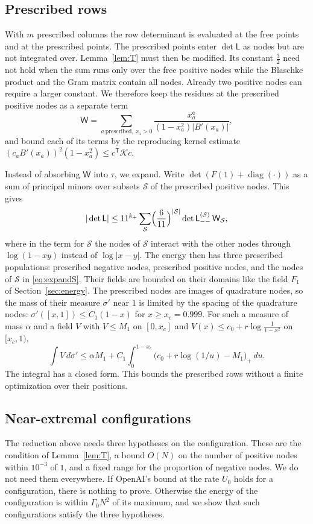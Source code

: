 \documentclass[11pt]{amsart}
\theoremstyle{definition}
\theoremstyle{remark}
\numberwithin{equation}{section}
\newcommand{\cK}{\mathcal K}
\begin{document}
\subsection{Prescribed rows}\label{ssec:fixedrows}
With $m$ prescribed columns the row determinant is evaluated at the free points and at the prescribed
points. The prescribed points enter $\det\mathsf L$ as nodes but are not integrated over. Lemma~\ref{lem:T}
must then be modified. Its constant $\frac32$ need not hold when the sum runs only over the free positive
nodes while the Blaschke product and the Gram matrix contain all nodes. Already two positive nodes can
require a larger constant. We therefore keep the residues at the prescribed positive nodes as a separate
term
\[
 \mathsf W=\sum_{a\ \text{prescribed},\,x_a>0}\frac{x_a^{\mathsf e}}{(1-x_a^2)|B'(x_a)|},
\]
and bound each of its terms by the reproducing kernel estimate
$(c_aB'(x_a))^2(1-x_a^2)\le c^{\mathsf T}\cK c$.

Instead of absorbing $\mathsf W$ into $\tau$, we expand. Write $\det(F(1)+\operatorname{diag}(\cdot))$ as a sum of
principal minors over subsets $\mathcal S$ of the prescribed positive nodes. This gives
\begin{equation}\label{eq:expandS}
 |\det\mathsf L|\le11^{k_+}\sum_{\mathcal S}\Bigl(\frac6{11}\Bigr)^{|\mathcal S|}\det\mathsf L_{--}^{(\mathcal S)}\,\mathsf W_{\mathcal S},
\end{equation}
where in the term for $\mathcal S$ the nodes of $\mathcal S$ interact with the other nodes through $\log(1-xy)$
instead of $\log|x-y|$. The energy then has three prescribed populations: prescribed negative nodes,
prescribed positive nodes, and the nodes of $\mathcal S$ in \eqref{eq:expandS}. Their fields are bounded on
their domains like the field $F_1$ of Section~\ref{sec:energy}. The prescribed nodes are images of quadrature
nodes, so the mass of their measure $\sigma'$ near $1$ is limited by the spacing of the quadrature nodes:
$\sigma'([x,1])\le C_1(1-x)$ for $x\ge x_c=0.999$. For such a measure of mass $\alpha$ and a field $V$ with
$V\le M_1$ on $[0,x_c]$ and $V(x)\le c_0+r\log\frac1{1-x^2}$ on $[x_c,1)$,
\[
 \int V\,d\sigma'\le\alpha M_1+C_1\int_0^{1-x_c}\bigl(c_0+r\log(1/u)-M_1\bigr)_+\,du .
\]
The integral has a closed form. This bounds the prescribed rows without a finite optimization over their
positions.

\subsection{Near-extremal configurations}\label{ssec:class}
The reduction above needs three hypotheses on the configuration. These are the condition of
Lemma~\ref{lem:T}, a bound $O(N)$ on the number of positive nodes within $10^{-3}$ of $1$, and a fixed range for
the proportion of negative nodes. We do not need them everywhere. If OpenAI's bound at the rate $U_0$ holds
for a configuration, there is nothing to prove. Otherwise the energy of the configuration is within
$\Gamma_0N^2$ of its maximum, and we show that such configurations satisfy the three hypotheses.
\end{document}
